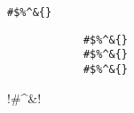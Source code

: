 \usepackage[thmmarks]{ntheorem}                 %
\theoremstyle{plain}                            %
\theoremheaderfont{\sffamily\bfseries}
\theorembodyfont{\normalfont}
\setlength\theorempreskipamount{5pt}
\setlength\theorempostskipamount{5pt}
\theoremsymbol{\ensuremath{\boxed{\phantom{n}}}}


\newtheorem{thm}{TheoremTitle}[section]         %

\newsavebox\verbbox                             % used for verbatim
\begin{lrbox}\verbbox
    \verb!#$%
\end{lrbox}

\newsavebox\verbatimbox                         % used for verbatim multiple lines
\begin{lrbox}\verbatimbox
    \begin{minipage}{10em}
        \begin{verbatim}
            #$%^&{}
            #$%^&{}
            #$%^&{}
        \end{verbatim}
    \end{minipage}
\end{lrbox}

\usepackage{fancyvrb}                           %
!#^&{}!                        %

\usepackage{cprotect}                           %

\usepackage{verbatim}                           %

